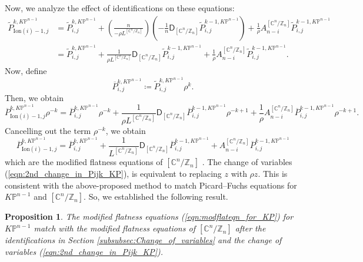 \documentclass[12pt]{amsart}
\newtheorem{prop}{Proposition}[section]
\numberwithin{equation}{section}
\newcommand{\CnZn}{[\mathbb{C}^n/\mathbb{Z}_n]}
\newcommand{\KP}{K\mathbb{P}}
\begin{document}
Now, we analyze the effect of identifications on these equations:
\begin{equation*}
\begin{aligned}
\widetilde{P}_{\mathrm{Ion}(i)-1,j}^{k,\KP^{n-1}}
&=\widetilde{P}_{i,j}^{k,\KP^{n-1}}+\left(\frac{n}{-{\rho}L^{\CnZn}}\right)\left({-\frac{1}{n}\mathsf{D}_{\CnZn}}\widetilde{P}_{i,j}^{k-1,\KP^{n-1}}\right)+\frac{1}{\rho}A^{\CnZn}_{n-i}\widetilde{P}_{i,j}^{k-1,\KP^{n-1}}\\
&=\widetilde{P}_{i,j}^{k,\KP^{n-1}}+\frac{1}{{\rho}L^{\CnZn}}{\mathsf{D}_{\CnZn}}\widetilde{P}_{i,j}^{k-1,\KP^{n-1}}+\frac{1}{\rho}A^{\CnZn}_{n-i}\widetilde{P}_{i,j}^{k-1,\KP^{n-1}}.
\end{aligned}
\end{equation*}
Now, define
\begin{equation}\label{eqn:2nd_change_in_Pijk_KP}
\overline{P}_{i,j}^{k,\KP^{n-1}}\coloneqq \widetilde{P}_{i,j}^{k,\KP^{n-1}}\rho^k.
\end{equation}
Then, we obtain
\begin{equation*}
\overline{P}_{\mathrm{Ion}(i)-1,j}^{k,\KP^{n-1}}\rho^{-k}=\overline{P}_{i,j}^{k,\KP^{n-1}}\rho^{-k}+\frac{1}{{\rho}L^{\CnZn}}{\mathsf{D}_{\CnZn}}\overline{P}_{i,j}^{k-1,\KP^{n-1}}\rho^{-k+1}+\frac{1}{\rho}A^{\CnZn}_{n-i}\overline{P}_{i,j}^{k-1,\KP^{n-1}}\rho^{-k+1}.
\end{equation*}
Cancelling out the term $\rho^{-k}$, we obtain
\begin{equation*}
\overline{P}_{\mathrm{Ion}(i)-1,j}^{k,\KP^{n-1}}=\overline{P}_{i,j}^{k,\KP^{n-1}}+\frac{1}{L^{\CnZn}}{\mathsf{D}_{\CnZn}}\overline{P}_{i,j}^{k-1,\KP^{n-1}}+A^{\CnZn}_{n-i}\overline{P}_{i,j}^{k-1,\KP^{n-1}}
\end{equation*}
which are the modified flatness equations of $\CnZn$ \cite[Equation 2.10]{gt}. The change of variables (\ref{eqn:2nd_change_in_Pijk_KP}), is equivalent to replacing $z$ with ${\rho}z$. This is consistent with the above-proposed method to match Picard--Fuchs equations for $\KP^{n-1}$ and $\CnZn$. So, we established the following result.

\begin{prop}\label{prop:Modified_Flatness_Match}
The modified flatness equations (\ref{eqn:modflateqn_for_KP}) for $\KP^{n-1}$ match with the modified flatness equations \cite[Equation 2.10]{gt} of $\CnZn$ after the identifications in Section \ref{subsubsec:Change_of_variables} and the change of variables (\ref{eqn:2nd_change_in_Pijk_KP}).
\end{prop}
\end{document}
